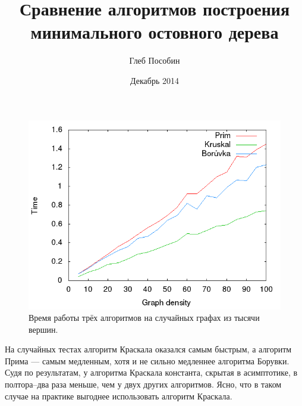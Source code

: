 \documentclass{article}
\title{Сравнение алгоритмов построения минимального остовного дерева}
\author{Глеб Пособин}
\date{Декабрь 2014}
\begin{document}
\maketitle

\begin{figure}[h!]
\centering
\includegraphics[width=1.0\textwidth]{Graphs.png}
\caption{Время работы трёх алгоритмов на случайных графах из тысячи вершин.}
\label{fig:performance_plot}
\end{figure}

На случайных тестах алгоритм Краскала оказался самым быстрым, а алгоритм Прима --- самым медленным, хотя и не сильно медленнее алгоритма Борувки.
Судя по результатам, у алгоритма Краскала константа, скрытая в асимптотике, в полтора--два раза меньше, чем у двух других алгоритмов.
Ясно, что в таком случае на практике выгоднее использовать алгоритм Краскала.
\end{document}

